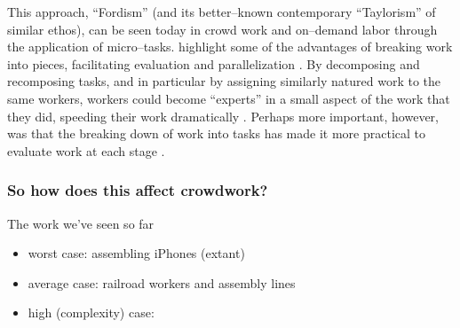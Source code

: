 \documentclass[trackingWork]{subfiles}
\begin{document}
This approach, ``Fordism'' (and its better--known contemporary ``Taylorism'' of similar ethos),
can be seen today in crowd work and on--demand labor through the application of micro--tasks.
\citeauthor{writingMicroTasks} highlight some of the advantages of breaking work into pieces,
facilitating evaluation and parallelization
\cite{writingMicroTasks}.
By decomposing and recomposing tasks,
and in particular by assigning similarly natured work to the same workers,
workers could become ``experts'' in a small aspect of the work that they did,
speeding their work dramatically
\cite{delayAndOrderLasecki}.
Perhaps more important, however, was that
the breaking down of work into tasks has made it more practical to evaluate work at each stage
\cite{rogstadius2011assessment}.

\subsubsection{So how does this affect crowdwork?}
The work we've seen so far 
\begin{itemize}
  \item worst case: assembling iPhones (extant)
  \item average case: railroad workers and assembly lines
  \item high (complexity) case: 
\end{itemize}



\end{document}
